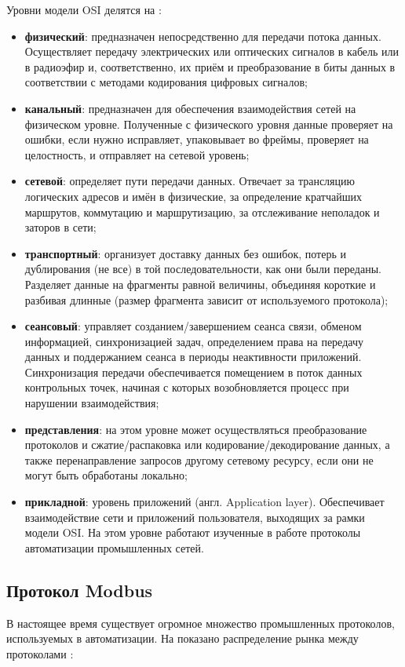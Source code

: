 \documentclass[../AISTR.tex]{subfiles}
\begin{document}
Уровни модели OSI делятся на \cite{kumar_survey_2012} :
\begin{itemize}
	\item \textbf{физический}: предназначен непосредственно для передачи потока данных. Осуществляет передачу электрических или оптических сигналов в кабель или в радиоэфир и, соответственно, их приём и преобразование в биты данных в соответствии с методами кодирования цифровых сигналов;
	\item \textbf{канальный}: предназначен для обеспечения взаимодействия сетей на физическом уровне. Полученные с физического уровня данные проверяет на ошибки, если нужно исправляет, упаковывает во фреймы, проверяет на целостность, и отправляет на сетевой уровень;
	\item \textbf{сетевой}: определяет пути передачи данных. Отвечает за трансляцию логических адресов и имён в физические, за определение кратчайших маршрутов, коммутацию и маршрутизацию, за отслеживание неполадок и заторов в сети;
	\item \textbf{транспортный}: организует доставку данных без ошибок, потерь и дублирования (не все) в той последовательности, как они были переданы. Разделяет данные на фрагменты равной величины, объединяя короткие и разбивая длинные (размер фрагмента зависит от используемого протокола);
	\item \textbf{сеансовый}: управляет созданием/завершением сеанса связи, обменом информацией, синхронизацией задач, определением права на передачу данных и поддержанием сеанса в периоды неактивности приложений. Синхронизация передачи обеспечивается помещением в поток данных контрольных точек, начиная с которых возобновляется процесс при нарушении взаимодействия;
	\item \textbf{представления}: на этом уровне может осуществляться преобразование протоколов и сжатие/распаковка или кодирование/декодирование данных, а также перенаправление запросов другому сетевому ресурсу, если они не могут быть обработаны локально;
	\item \textbf{прикладной}: уровень приложений (англ. Application layer). Обеспечивает взаимодействие сети и приложений пользователя, выходящих за рамки модели OSI. На этом уровне работают изученные в работе протоколы автоматизации промышленных сетей.
\end{itemize}

\subsection{Протокол Modbus}
В настоящее время существует огромное множество промышленных протоколов, используемых в автоматизации. На  показано распределение рынка между протоколами \cite{promwad__2019}:
\end{document}
